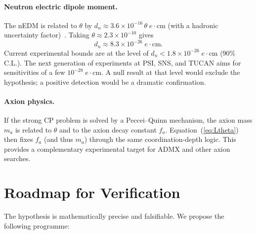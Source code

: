 \documentclass[12pt,a4paper]{article}
\begin{document}
	\paragraph{Neutron electric dipole moment.}
	The nEDM is related to \(\theta\) by \(d_n \approx 3.6 \times 10^{-16}\,\theta\; e\!\cdot\!\mathrm{cm}\) (with a hadronic uncertainty factor)~\cite{nEDM2020}. Taking \(\theta \approx 2.3 \times 10^{-10}\) gives
	\[
	d_n \approx 8.3 \times 10^{-26}\; e\!\cdot\!\mathrm{cm}.
	\]
	Current experimental bounds are at the level of \(d_n < 1.8 \times 10^{-26}\; e\!\cdot\!\mathrm{cm}\) (90\% C.L.). The next generation of experiments at PSI, SNS, and TUCAN aims for sensitivities of a few \(10^{-28}\; e\!\cdot\!\mathrm{cm}\). A null result at that level would exclude the hypothesis; a positive detection would be a dramatic confirmation.
	
	\paragraph{Axion physics.}
	If the strong CP problem is solved by a Peccei–Quinn mechanism, the axion mass \(m_a\) is related to \(\theta\) and to the axion decay constant \(f_a\). Equation~(\ref{eq:Ltheta}) then fixes \(f_a\) (and thus \(m_a\)) through the same coordination‑depth logic. This provides a complementary experimental target for ADMX and other axion searches.
	
	\section{Roadmap for Verification}
	\label{sec:roadmap}
	
	The hypothesis is mathematically precise and falsifiable. We propose the following programme:
	
\end{document}
